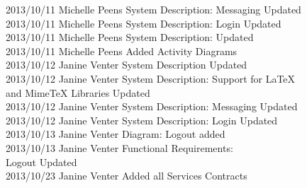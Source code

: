 \documentclass[29pt,a4paper]{moderncv}
\begin{document}
\begin{tabbing}
2013/10/11  \> Michelle Peens \> System Description: Messaging Updated\\
2013/10/11  \> Michelle Peens \> System Description: Login Updated\\
2013/10/11  \> Michelle Peens \> System Description: Updated\\
2013/10/11  \> Michelle Peens \> Added Activity Diagrams\\
2013/10/12  \> Janine Venter \> System Description Updated\\
2013/10/12  \> Janine Venter \> System Description: Support for LaTeX \\ \> \> \> and MimeTeX Libraries Updated\\
2013/10/12  \> Janine Venter \> System Description: Messaging Updated\\
2013/10/12  \> Janine Venter \> System Description: Login Updated\\
2013/10/13  \> Janine Venter \> Diagram: Logout added\\
2013/10/13  \> Janine Venter \> Functional Requirements: \\ \> \> \> Logout Updated\\
2013/10/23  \> Janine Venter \> Added all Services Contracts \\


\end{tabbing}


\newpage
\end{document}
